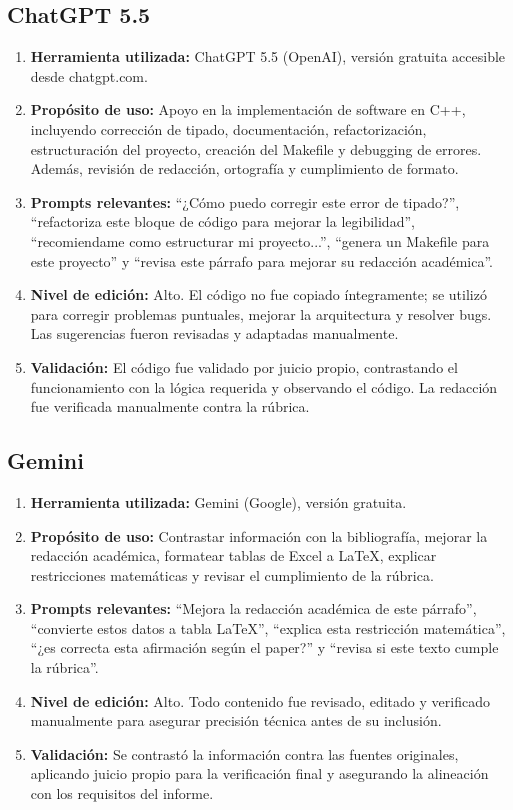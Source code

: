 \documentclass[letter, 10pt, dvipdfmx]{article}
\begin{document}
\begin{small}
\subsection{ChatGPT 5.5}
\begin{enumerate}
  \item \textbf{Herramienta utilizada:} ChatGPT 5.5 (OpenAI), versión gratuita accesible desde chatgpt.com.
  \item \textbf{Propósito de uso:} Apoyo en la implementación de software en C++, incluyendo corrección de tipado, documentación, refactorización, estructuración del proyecto, creación del Makefile y debugging de errores. Además, revisión de redacción, ortografía y cumplimiento de formato.
  \item \textbf{Prompts relevantes:} ``¿Cómo puedo corregir este error de tipado?'', ``refactoriza este bloque de código para mejorar la legibilidad'', ``recomiendame como estructurar mi proyecto...'', ``genera un Makefile para este proyecto'' y ``revisa este párrafo para mejorar su redacción académica''.
  \item \textbf{Nivel de edición:} Alto. El código no fue copiado íntegramente; se utilizó para corregir problemas puntuales, mejorar la arquitectura y resolver bugs. Las sugerencias fueron revisadas y adaptadas manualmente.
  \item \textbf{Validación:} El código fue validado por juicio propio, contrastando el funcionamiento con la lógica requerida y observando el código. La redacción fue verificada manualmente contra la rúbrica.
\end{enumerate}

\subsection{Gemini}
\begin{enumerate}
  \item \textbf{Herramienta utilizada:} Gemini (Google), versión gratuita.
  \item \textbf{Propósito de uso:} Contrastar información con la bibliografía, mejorar la redacción académica, formatear tablas de Excel a LaTeX, explicar restricciones matemáticas y revisar el cumplimiento de la rúbrica.
  \item \textbf{Prompts relevantes:} ``Mejora la redacción académica de este párrafo'', ``convierte estos datos a tabla LaTeX'', ``explica esta restricción matemática'', ``¿es correcta esta afirmación según el paper?'' y ``revisa si este texto cumple la rúbrica''.
  \item \textbf{Nivel de edición:} Alto. Todo contenido fue revisado, editado y verificado manualmente para asegurar precisión técnica antes de su inclusión.
  \item \textbf{Validación:} Se contrastó la información contra las fuentes originales, aplicando juicio propio para la verificación final y asegurando la alineación con los requisitos del informe.
\end{enumerate}
\end{small}

\printbibliography
\end{document}

